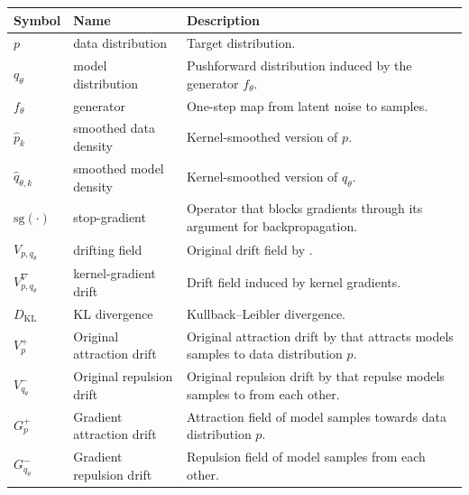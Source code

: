 \documentclass{article}
\theoremstyle{plain}
\begin{document}
\begin{tabularx}{\textwidth}{llX}
\toprule
\textbf{Symbol} & \textbf{Name} & \textbf{Description} \\
\midrule
$p$ & data distribution & Target distribution. \\
$q_\theta$ & model distribution & Pushforward distribution induced by the generator $f_\theta$. \\
$f_\theta$ & generator & One-step map from latent noise to samples. \\
$\widehat{p}_k$ & smoothed data density & Kernel-smoothed version of $p$. \\
$\widehat{q}_{\theta,k}$ & smoothed model density & Kernel-smoothed version of $q_\theta$. \\
$\mathrm{sg}(\cdot)$ & stop-gradient & Operator that blocks gradients through its argument for backpropagation. \\
$V_{p,q_\theta}$ & drifting field & Original drift field by \citep{Deng_2026_Drift}. \\
$V^\nabla_{p,q_\theta}$ & kernel-gradient drift & Drift field induced by kernel gradients. \\
$D_{\mathrm{KL}}$ & KL divergence & Kullback--Leibler divergence. \\

$V_p^{+}$ & Original attraction drift & Original attraction drift by \citep{Deng_2026_Drift} that attracts models samples to data distribution $p$.\\ 
$V_{q_\theta}^{-}$ & Original repulsion drift & Original repulsion drift by \citep{Deng_2026_Drift} that  repulse models samples to  from each other.\\ 

$G_p^{+}$ & Gradient attraction drift & Attraction field of model samples towards data distribution $p$.\\ 
$G_{q_\theta}^{-}$ & Gradient repulsion drift & Repulsion field of model samples  from each other.\\ 


\end{tabularx}
\end{document}
